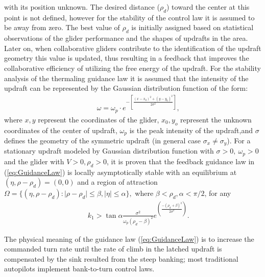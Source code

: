 \documentclass{ifacconf}
\begin{document}
with its position unknown. The desired distance ($\rho_d$) toward the center at this
point is not defined, however for the stability of the control law it is assumed to be
away from zero. The best value of $\rho_d$ is initially assigned based on statistical
observations of the glider performance and the shapes of updrafts in the area. Later on,
when collaborative gliders contribute to the identification of the updraft geometry this
value is updated, thus resulting in a feedback that improves the collaborative efficiency
of utilizing the free energy of the updraft. For the stability analysis of the thermaling
guidance law it is assumed that the intensity of the updraft can be represented by the
Gaussian distribution function of the form:
\begin{eqnarray}
    && \omega=\omega_p \cdot e^{-[\frac{(x-x_0)^2+(y-y_0)^2}{2\sigma^2}]},
    \label{eq:GaussUpdraft}
\end{eqnarray}
where $x, y$ represent the coordinates of the glider, $x_0, y_o$ represent the unknown
coordinates of the center of updraft, $\omega_p$ is the peak intensity of the updraft,and
$\sigma$ defines the geometry of the symmetric updraft (in general case $\sigma_x \neq
\sigma_y$). For a stationary updraft modeled by Gaussian distribution function with
$\sigma>0,~\omega_p>0$ and the glider with $V>0, \rho_d>0$, it is proven that the
feedback guidance law in (\ref{eq:GuidanceLaw}) is locally asymptotically stable with an
equilibrium at $(\eta, \rho-\rho_d)=(0,0)$ and a region of attraction $\Omega=\{(\eta,
\rho-\rho_d): \vert \rho-\rho_d \vert \leq \beta,  \vert \eta \vert \leq \alpha \}, $
where $\beta < \rho_d, \alpha< \pi/2$, for any
\begin{eqnarray}
    && k_1 > \tan \alpha \frac{\sigma^2}{\omega_p(\rho_d-\beta)^2}
    e^(\frac{-(\rho_d+\beta)^2}{2\sigma^2} ).\nonumber
    \label{eq:GuidanceGain}
\end{eqnarray}

The physical meaning of the guidance law (\ref{eq:GuidanceLaw}) is to increase the
commanded turn rate until the rate of climb in the latched updraft is compensated by the
sink resulted from the steep banking; most traditional autopilots implement bank-to-turn
control laws.

\end{document}
